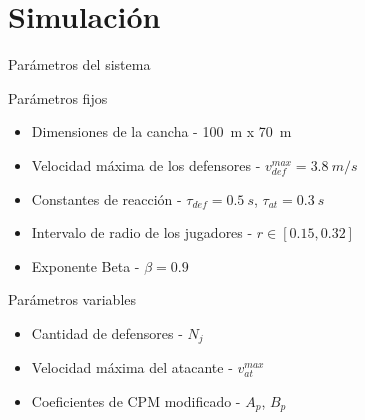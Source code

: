 \section{Simulación}\label{sec:simulacion}
\begin{frame}{Parámetros del sistema}
    \begin{block}{Parámetros fijos}
        \begin{itemize}
            \item Dimensiones de la cancha - 100\ m x 70\ m\)
            \item Velocidad máxima de los defensores - \(v_{def}^{max} = 3.8\ m/s\)
            \item Constantes de reacción - \(\tau_{def} = 0.5\ s\), \(\tau_{at} = 0.3\ s\)
            \item Intervalo de radio de los jugadores - \(r \in [0.15, 0.32]\)
            \item Exponente Beta - \(\beta = 0.9\)
        \end{itemize}
    \end{block}
    \begin{block}{Parámetros variables}
        \begin{itemize}
            \item Cantidad de defensores - \(N_j\)
            \item Velocidad máxima del atacante - \(v_{at}^{max}\)
            \item Coeficientes de CPM modificado - \(A_p\), \(B_p\)
        \end{itemize}
    \end{block}
\end{frame}

